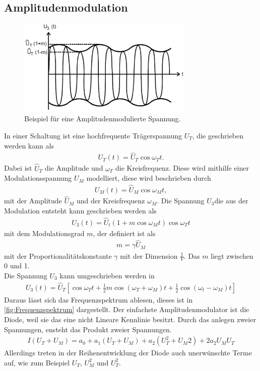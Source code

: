 \subsection{Amplitudenmodulation}
\begin{figure}[h!]
	\centering
	\includegraphics[width = 0.75\textwidth]{../Grafiken/Frequenzbaender.pdf}
	\caption{Beispiel für eine Amplitudenmodulierte Spannung.\cite{V59}}
\end{figure}
In einer Schaltung ist eine hochfrequente Trägerspannung $U_T$, die geschrieben werden kann als
\begin{align}
	U_T(t)=\hat U_T\cos\omega_Tt.
\end{align}
Dabei ist $\hat U_T$ die Amplitude und $\omega_T$ die Kreisfrequenz.
Diese wird mithilfe einer Modulationsspannung $U_M$ modelliert, diese wird beschrieben durch
\begin{align}
	U_M(t)=\hat U_M\cos\omega_Mt,
\end{align}
mit der Amplitude $\hat U_M$ und der Kreisfrequenz $\omega_M$.
Die Spannung $U_3$die aus der Modulation entsteht kann geschrieben werden als
\begin{align}
	U_3(t)=\hat U_t\left(1+m\cos\omega_Mt\right)\cos \omega_Tt
\end{align}
mit dem Modulationsgrad $m$, der definiert ist als 
\begin{align}
	m = \gamma \hat U_M
\end{align}
mit der Proportionalitätskonstante $\gamma$ mit der Dimension $\frac{1}{V}$.
Das $m$ liegt zwischen 0 und 1.\\
Die Spannung $U_3$ kann umgeschrieben werden in
\begin{align}
	U_3(t)=\hat U_T\left[\cos\omega_Tt+\frac{1}{2}m\cos\left(\omega_T+\omega_M\right)t+\frac{1}{2}\cos\left(\omega_t-\omega_M\right)t\right]
\end{align}
Daraus lässt sich das Frequenzspektrum ablesen, dieses ist in \cref{fig:Frequenzspektrum} dargestellt.
Der einfachste Amplitudenmodulator ist die Diode, weil sie das eine nicht Lineare Kennlinie besitzt.
Durch das anlegen zweier Spannungen, ensteht das Produkt zweier Spannungen. 
\begin{align}
	I(U_T+U_M)=a_0+a_1(U_T+U_M)+a_2\left(U_T^2+U_M 2\right)+2a_2U_MU_T
\end{align}
Allerdings treten in der Reihenentwicklung der Diode auch unerwünschte Terme auf, wie zum Beispiel $U_T$, $U_M^2$ und $U_T^2$.

